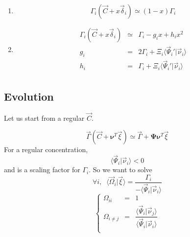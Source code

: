 \documentclass[aps,12pt]{revtex4}
\begin{document}
\begin{enumerate}
\item
\begin{equation}
	\Gamma_i(\vec{C} + x \vec{\delta}_i) \simeq (1-x) \Gamma_i
\end{equation}

\item
\begin{equation}
\begin{array}{rcl}
	\Gamma_i(\vec{C} + x  \vec{\delta}_i) & \simeq & \Gamma_i -g_i x + h_i x^2\\
	g_i & = & 2\Gamma_i + \Xi_i \langle\vec{\Psi}_i'  \vert \vec{\nu}_i \rangle\\
	h_i & = & \Gamma_i + \Xi_i \langle\vec{\Psi}_i'  \vert \vec{\nu}_i \rangle\\
\end{array}
\end{equation}

\end{enumerate}
 

 
\subsection{Evolution}
Let us start from a regular $\vec{C}$.

\begin{equation}
	\vec{\Gamma}(\vec{C}+\bm{\nu}^T \vec{\xi}) \simeq \vec{\Gamma} + \bm{\Psi} \bm{\nu}^T \vec{\xi}
\end{equation}
For a regular concentration,
\begin{equation}
	\langle\vec{\Psi}_i \vert \vec{\nu}_i\rangle < 0
\end{equation}
and is a scaling factor for $\Gamma_i$. So we want to solve
\begin{equation}
	\forall i, \;\; \langle \vec{\Omega}_i \vert \vec{\xi} \rangle = \dfrac{\Gamma_i}{-\langle\vec{\Psi}_i \vert \vec{\nu}_i\rangle}
\end{equation}
\begin{equation}
\left\lbrace
	\begin{array}{rcl}
	\Omega_{ii}   & = & 1\\
	\Omega_{i\not=j} & = & \dfrac{\langle\vec{\Psi}_i \vert \vec{\nu}_j\rangle}{\langle\vec{\Psi}_i \vert \vec{\nu}_i\rangle}\\
	\end{array}
\right.
\end{equation}
\end{document}
